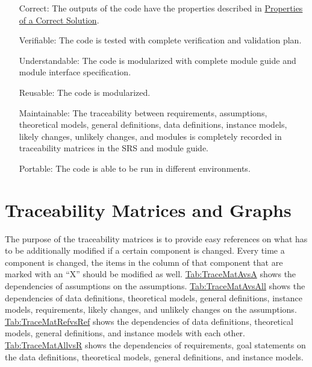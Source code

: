 \documentclass[12pt]{article}
\begin{document}
\begin{itemize}
\item[Correct:\phantomsection\label{correct}]{The outputs of the code have the properties described in \hyperref[Sec:CorSolProps]{Properties of a Correct Solution}.}
\item[Verifiable:\phantomsection\label{verifiable}]{The code is tested with complete verification and validation plan.}
\item[Understandable:\phantomsection\label{understandable}]{The code is modularized with complete module guide and module interface specification.}
\item[Reusable:\phantomsection\label{reusable}]{The code is modularized.}
\item[Maintainable:\phantomsection\label{maintainable}]{The traceability between requirements, assumptions, theoretical models, general definitions, data definitions, instance models, likely changes, unlikely changes, and modules is completely recorded in traceability matrices in the SRS and module guide.}
\item[Portable:\phantomsection\label{portable}]{The code is able to be run in different environments.}
\end{itemize}
\section{Traceability Matrices and Graphs}
\label{Sec:TraceMatrices}
The purpose of the traceability matrices is to provide easy references on what has to be additionally modified if a certain component is changed. Every time a component is changed, the items in the column of that component that are marked with an ``X'' should be modified as well. \hyperref[Table:TraceMatAvsA]{Tab:TraceMatAvsA} shows the dependencies of assumptions on the assumptions. \hyperref[Table:TraceMatAvsAll]{Tab:TraceMatAvsAll} shows the dependencies of data definitions, theoretical models, general definitions, instance models, requirements, likely changes, and unlikely changes on the assumptions. \hyperref[Table:TraceMatRefvsRef]{Tab:TraceMatRefvsRef} shows the dependencies of data definitions, theoretical models, general definitions, and instance models with each other. \hyperref[Table:TraceMatAllvsR]{Tab:TraceMatAllvsR} shows the dependencies of requirements, goal statements on the data definitions, theoretical models, general definitions, and instance models.
\end{document}
